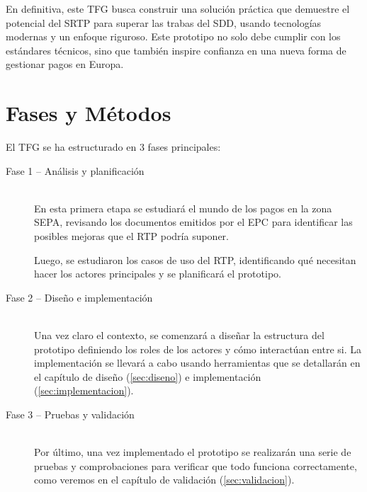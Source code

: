 En definitiva, este TFG busca construir una solución práctica que demuestre el potencial del SRTP para superar las trabas del SDD, usando tecnologías modernas y un enfoque riguroso. Este prototipo no solo debe cumplir con los estándares técnicos, sino que también inspire confianza en una nueva forma de gestionar pagos en Europa.

\section{Fases y Métodos}
\label{subsec:FasesMetodos}
El TFG se ha estructurado en 3 fases principales:

\begin{description}
  \item[Fase 1 – Análisis y planificación]\\
      En esta primera etapa se estudiará el mundo de los pagos en la zona SEPA, revisando los documentos emitidos por el EPC \cite{EPC_official} para identificar las posibles mejoras que el RTP podría suponer.
      
      Luego, se estudiaron los casos de uso del RTP, identificando qué necesitan hacer los actores principales y se planificará el prototipo.
  \item[Fase 2 – Diseño e implementación]\\
      Una vez claro el contexto, se comenzará a diseñar la estructura del prototipo definiendo los roles de los actores y cómo interactúan entre si.
      La implementación se llevará a cabo usando herramientas que se detallarán en el capítulo de diseño (\ref{sec:diseno}) e implementación (\ref{sec:implementacion}).
  \item[Fase 3 – Pruebas y validación]\\
      Por último, una vez implementado el prototipo se realizarán una serie de pruebas y comprobaciones para verificar que todo funciona correctamente, como veremos en el capítulo de validación (\ref{sec:validacion}).
\end{description}

